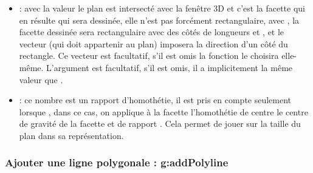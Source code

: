 \begin{itemize}
    \item {} : avec la valeur \nil le plan est intersecté avec la fenêtre 3D et c'est la facette qui en résulte qui sera dessinée, elle n'est pas forcément rectangulaire, avec , la facette dessinée sera rectangulaire avec des côtés de longueurs  et , et le vecteur  (qui doit appartenir au plan) imposera la direction d'un côté du rectangle. Ce vecteur  est facultatif, s'il est omis la fonction le choisira elle-même. L'argument  est facultatif, s'il est omis, il a implicitement la même valeur que .
    
    \item {} : ce nombre est un rapport d'homothétie, il est pris en compte seulement lorsque , dans ce cas, on applique à la facette l'homothétie de centre le centre de gravité de la facette et de rapport . Cela permet de jouer sur la taille du plan dans sa représentation.
\end{itemize}

        

\subsubsection{Ajouter une ligne polygonale : g:addPolyline}

